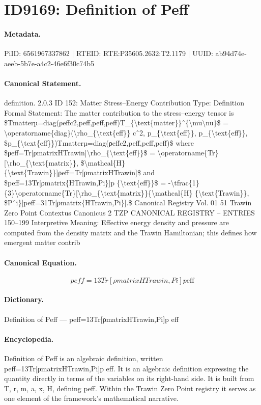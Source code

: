 \section*{ID9169: Definition of Peff}
\paragraph{Metadata.}
PiID: 6561967337862 | RTEID: RTE:P35605.2632:T2.1179 | UUID: ab94d74e-aeeb-5b7e-a4c2-46e6f30c74b5

\paragraph{Canonical Statement.}
definition. 2.0.3 ID 152: Matter Stress–Energy Contribution Type: Definition Formal Statement: The matter contribution to the stress–energy tensor is \$Tmatterµ=diag(ρeffc2,peff,peff,peff)T\_\{\textbackslash{}text\{matter\}\}ˆ\{\textbackslash{}mu\textbackslash{}nu\}\$ = \textbackslash{}operatorname\{diag\}(\textbackslash{}rho\_\{\textbackslash{}text\{eff\}\} cˆ2, p\_\{\textbackslash{}text\{eff\}\}, p\_\{\textbackslash{}text\{eff\}\}, \$p\_\{\textbackslash{}text\{eff\}\})Tmatterµ=diag(ρeffc2,peff,peff,peff)\$ where \$ρeff=Tr[ρmatrixHTrawin]\textbackslash{}rho\_\{\textbackslash{}text\{eff\}\}\$ = \textbackslash{}operatorname\{Tr\}[\textbackslash{}rho\_\{\textbackslash{}text\{matrix\}\}, \$\textbackslash{}mathcal\{H\} \{\textbackslash{}text\{Trawin\}\}]ρeff=Tr[ρmatrixHTrawin]\$ and \$peff=13Tr[ρmatrix\{HTrawin,Pi\}]p \{\textbackslash{}text\{eff\}\}\$ = -\textbackslash{}tfrac\{1\}\{3\}\textbackslash{}operatorname\{Tr\}[\textbackslash{}rho\_\{\textbackslash{}text\{matrix\}\}\{\textbackslash{}mathcal\{H\} \{\textbackslash{}text\{Trawin\}\}, \$Pˆi\}]peff=31Tr[ρmatrix\{HTrawin,Pi\}].\$ Canonical Registry Vol. 01 51 Trawin Zero Point Contextus Canonicus 2 TZP CANONICAL REGISTRY – ENTRIES 150–199 Interpretive Meaning: Effective energy density and pressure are computed from the density matrix and the Trawin Hamiltonian; this defines how emergent matter contrib

\paragraph{Canonical Equation.}
\[
peff=13Tr[ρmatrix{HTrawin,Pi}]p {\text{eff}}
\]

\paragraph{Dictionary.}
Definition of Peff — peff=13Tr[ρmatrixHTrawin,Pi]p eff

\paragraph{Encyclopedia.}
Definition of Peff is an algebraic definition, written peff=13Tr[ρmatrixHTrawin,Pi]p eff. It is an algebraic definition expressing the quantity directly in terms of the variables on its right-hand side. It is built from T, r, m, a, x, H, defining peff. Within the Trawin Zero Point registry it serves as one element of the framework's mathematical narrative.
